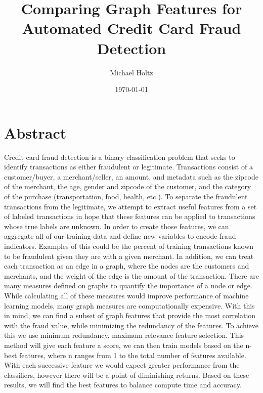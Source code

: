 \documentclass{article}
\title{Comparing Graph Features for Automated Credit Card Fraud Detection}
\author{Michael Holtz}
\date{\today}
\begin{document}
\maketitle

\section{Abstract}
	Credit card fraud detection is a binary classification problem that seeks to identify transactions as either fraudulent or legitimate. Transactions consist of a customer/buyer, a merchant/seller, an amount, and metadata such as the zipcode of the merchant, the age, gender and zipcode of the customer, and the category of the purchase (transportation, food, health, etc.). To separate the fraudulent transactions from the legitimate, we attempt to extract useful features from a set of labeled transactions in hope that these features can be applied to transactions whose true labels are unknown. In order to create those features, we can aggregate all of our training data and define new variables to encode fraud indicators. Examples of this could be the percent of training transactions known to be fraudulent given they are with a given merchant. In addition, we can treat each transaction as an edge in a graph, where the nodes are the customers and merchants, and the weight of the edge is the amount of the transaction. There are many measures defined on graphs to quantify the importance of a node or edge. While calculating all of these measures would improve performance of machine learning models, many graph measures are computationally expensive. With this in mind, we can find a subset of graph features that provide the most correlation with the fraud value, while minimizing the redundancy of the features. To achieve this we use minimum redundancy, maximum relevance feature selection. This method will give each feature a score, we can then train models based on the n-best features, where n ranges from 1 to the total number of features available. With each successive feature we would expect greater performance from the classifiers, however there will be a point of diminishing returns. Based on these results, we will find the best features to balance compute time and accuracy. 
\end{document}
